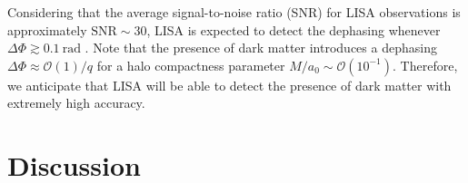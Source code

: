 \documentclass[11pt]{article}
\begin{document}
Considering that the average signal-to-noise ratio (SNR) for LISA observations is approximately $\textrm{SNR}\sim 30$, LISA is expected to detect the dephasing whenever $\Delta\Phi\gtrsim 0.1~\textrm{rad}$ \cite{PhysRevLett.123.101103}. Note that the presence of dark matter introduces a dephasing $\Delta\Phi\approx \mathcal{O}(1)/q$ for a halo compactness parameter $M/a_0\sim \mathcal{O}(10^{-1})$. Therefore, we anticipate that LISA will be able to detect the presence of dark matter with extremely high accuracy.


\section{Discussion}\label{dscn}
\end{document}
